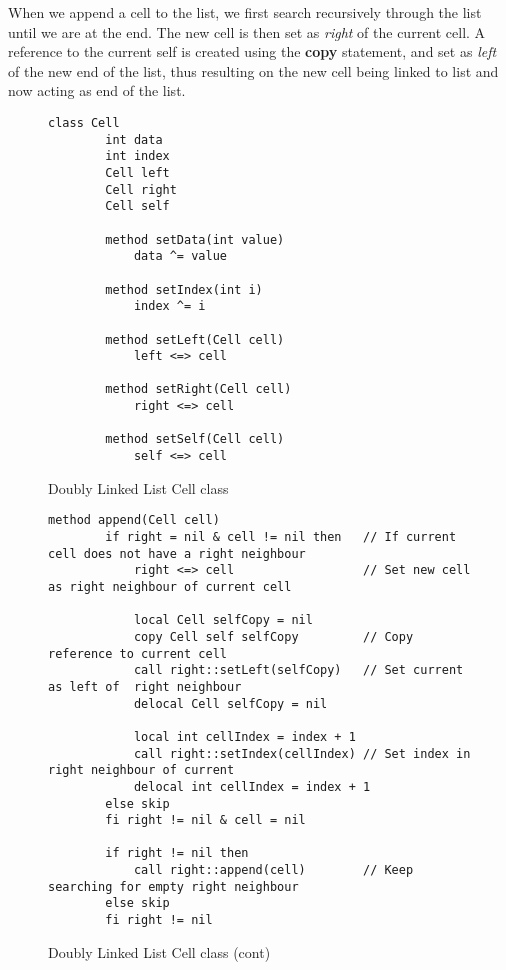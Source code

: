 When we append a cell to the list, we first search recursively through the list until we are at the end. The new cell is then set as \textit{right} of the current cell. A reference to the current self is created using the \textbf{copy} statement, and set as \textit{left} of the new end of the list, thus resulting on the new cell being linked to list and now acting as end of the list.

\begin{figure}[ht!]
    \centering
    \begin{lstlisting}[style = basic, language = roopl] 
        class Cell
        int data
        int index
        Cell left
        Cell right
        Cell self
    
        method setData(int value)
            data ^= value
    
        method setIndex(int i)
            index ^= i    
    
        method setLeft(Cell cell)
            left <=> cell
    
        method setRight(Cell cell)
            right <=> cell
    
        method setSelf(Cell cell)
            self <=> cell
    \end{lstlisting}
    \caption{Doubly Linked List Cell class}
    \label{fig:doubly-linked-list-cell-class}
\end{figure}

\begin{figure}[ht!]
    \centering
    \begin{lstlisting}[style = basic, language = roopl]
    method append(Cell cell)
        if right = nil & cell != nil then   // If current cell does not have a right neighbour
            right <=> cell                  // Set new cell as right neighbour of current cell
        
            local Cell selfCopy = nil      
            copy Cell self selfCopy         // Copy reference to current cell
            call right::setLeft(selfCopy)   // Set current as left of  right neighbour
            delocal Cell selfCopy = nil

            local int cellIndex = index + 1
            call right::setIndex(cellIndex) // Set index in right neighbour of current
            delocal int cellIndex = index + 1
        else skip
        fi right != nil & cell = nil

        if right != nil then
            call right::append(cell)        // Keep searching for empty right neighbour
        else skip
        fi right != nil 
    \end{lstlisting}
    \caption{Doubly Linked List Cell class (cont)}
    \label{fig:doubly-linked-list-cell-class-cont}
\end{figure}

